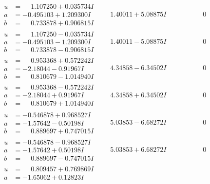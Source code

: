 \documentclass[1p]{elsarticle_modified}
\theoremstyle{definition}
\begin{document}
$$\begin{array}{c|c|c}
 \hline 
\begin{aligned}
u &= \phantom{-}1.107250 + 0.035734 I \\
a &= -0.495103 + 1.209300 I \\
b &= \phantom{-}0.733878 + 0.906815 I\end{aligned}
 & \phantom{-}1.40011 + 5.08875 I & \phantom{-0.000000 } 0 \\ \hline\begin{aligned}
u &= \phantom{-}1.107250 - 0.035734 I \\
a &= -0.495103 - 1.209300 I \\
b &= \phantom{-}0.733878 - 0.906815 I\end{aligned}
 & \phantom{-}1.40011 - 5.08875 I & \phantom{-0.000000 } 0 \\ \hline\begin{aligned}
u &= \phantom{-}0.953368 + 0.572242 I \\
a &= -2.18044 - 0.91967 I \\
b &= \phantom{-}0.810679 - 1.014940 I\end{aligned}
 & \phantom{-}4.34858 - 6.34502 I & \phantom{-0.000000 } 0 \\ \hline\begin{aligned}
u &= \phantom{-}0.953368 - 0.572242 I \\
a &= -2.18044 + 0.91967 I \\
b &= \phantom{-}0.810679 + 1.014940 I\end{aligned}
 & \phantom{-}4.34858 + 6.34502 I & \phantom{-0.000000 } 0 \\ \hline\begin{aligned}
u &= -0.546878 + 0.968527 I \\
a &= -1.57642 - 0.50198 I \\
b &= \phantom{-}0.889697 + 0.747015 I\end{aligned}
 & \phantom{-}5.03853 - 6.68272 I & \phantom{-0.000000 } 0 \\ \hline\begin{aligned}
u &= -0.546878 - 0.968527 I \\
a &= -1.57642 + 0.50198 I \\
b &= \phantom{-}0.889697 - 0.747015 I\end{aligned}
 & \phantom{-}5.03853 + 6.68272 I & \phantom{-0.000000 } 0 \\ \hline\begin{aligned}
u &= \phantom{-}0.809457 + 0.769869 I \\
a &= -1.65062 + 0.12823 I \\

\end{aligned}
\end{array}$$
\end{document}
